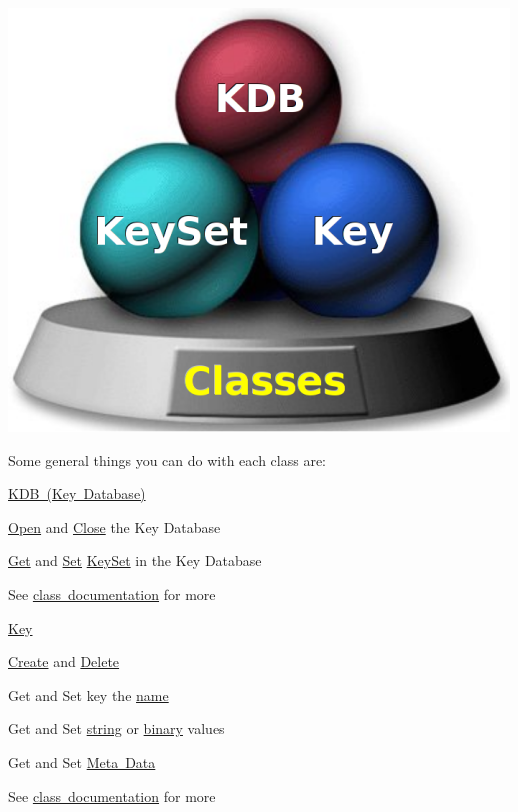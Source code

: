 \begin{DoxyImage}
\includegraphics[width=\textwidth,height=\textheight/2,keepaspectratio=true]{classes.png}
\end{DoxyImage}


Some general things you can do with each class are\+:

\mbox{\hyperlink{group__kdb}{K\+DB (Key Database)}}


\begin{DoxyItemize}
\item \mbox{\hyperlink{group__kdb_ga6808defe5870f328dd17910aacbdc6ca}{Open}} and \mbox{\hyperlink{group__kdb_gadb54dc9fda17ee07deb9444df745c96f}{Close}} the Key Database
\item \mbox{\hyperlink{group__kdb_ga28e385fd9cb7ccfe0b2f1ed2f62453a1}{Get}} and \mbox{\hyperlink{group__kdb_ga11436b058408f83d303ca5e996832bcf}{Set}} \mbox{\hyperlink{group__keyset}{Key\+Set}} in the Key Database
\item See \mbox{\hyperlink{group__kdb}{class documentation}} for more
\end{DoxyItemize}

\mbox{\hyperlink{group__key}{Key}}


\begin{DoxyItemize}
\item \mbox{\hyperlink{group__key_gad23c65b44bf48d773759e1f9a4d43b89}{Create}} and \mbox{\hyperlink{group__key_ga3df95bbc2494e3e6703ece5639be5bb1}{Delete}}
\item Get and Set key the \mbox{\hyperlink{group__keyname_ga7699091610e7f3f43d2949514a4b35d9}{name}}
\item Get and Set \mbox{\hyperlink{group__keyvalue_ga622bde1eb0e0c4994728331326340ef2}{string}} or \mbox{\hyperlink{group__keyvalue_gaa50a5358fd328d373a45f395fa1b99e7}{binary}} values
\item Get and Set \mbox{\hyperlink{group__keymeta}{Meta Data}}
\item See \mbox{\hyperlink{group__key}{class documentation}} for more
\end{DoxyItemize}

